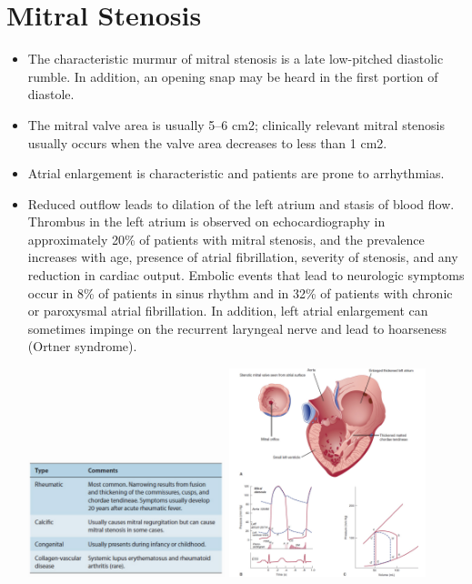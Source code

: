 \documentclass[11pt]{article}
\begin{document}
\section{Mitral Stenosis}
\label{sec:MitralStenosis}

\begin{itemize}
\item The characteristic murmur of mitral stenosis is a late low-pitched diastolic rumble. In addition, an opening snap may be heard in the first portion of diastole.
\item The mitral valve area is usually 5–6 cm2; clinically relevant mitral stenosis usually occurs when the valve area decreases to less than 1 cm2.
\item Atrial enlargement is characteristic and patients are prone to arrhythmias.
\item Reduced outflow leads to dilation of the left atrium and stasis of blood flow. Thrombus in the left atrium is observed on echocardiography in approximately 20\% of patients with mitral stenosis, and the prevalence increases with age, presence of atrial fibrillation, severity of stenosis, and any reduction in cardiac output. Embolic events that lead to neurologic symptoms occur in 8\% of patients in sinus rhythm and in 32\% of patients with chronic or paroxysmal atrial fibrillation. In addition, left atrial enlargement can sometimes impinge on the recurrent laryngeal nerve and lead to hoarseness (Ortner syndrome).
  
\includegraphics[width=0.45\textwidth]{images/causes_of_mitral_stenosis.png}
\includegraphics[width=0.45\textwidth]{images/characteristics_of_mitral_stenosis.png}
\end{itemize}
\end{document}
